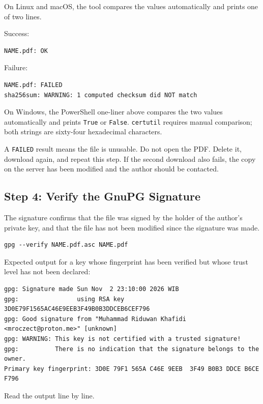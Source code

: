 On Linux and macOS, the tool compares the values automatically and
prints one of two lines.

Success:

\begin{lstlisting}[style=out]
NAME.pdf: OK
\end{lstlisting}

Failure:

\begin{lstlisting}[style=out]
NAME.pdf: FAILED
sha256sum: WARNING: 1 computed checksum did NOT match
\end{lstlisting}

On Windows, the PowerShell one-liner above compares the two values
automatically and prints \texttt{True} or \texttt{False}.
\texttt{certutil} requires manual comparison; both strings are
sixty-four hexadecimal characters.

A \texttt{FAILED} result means the file is unusable. Do not open
the PDF. Delete it, download again, and repeat this step. If the
second download also fails, the copy on the server has been
modified and the author should be contacted.

\subsection*{Step 4: Verify the GnuPG Signature}

The signature confirms that the file was signed by the holder of
the author's private key, and that the file has not been modified
since the signature was made.

\begin{lstlisting}[style=code]
gpg --verify NAME.pdf.asc NAME.pdf
\end{lstlisting}

Expected output for a key whose fingerprint has been verified but
whose trust level has not been declared:

\begin{lstlisting}[style=out]
gpg: Signature made Sun Nov  2 23:10:00 2026 WIB
gpg:                using RSA key 3D0E79F1565AC46E9EEB3F49B0B3DDCEB6CEF796
gpg: Good signature from "Muhammad Riduwan Khafidi <mroczect@proton.me>" [unknown]
gpg: WARNING: This key is not certified with a trusted signature!
gpg:          There is no indication that the signature belongs to the owner.
Primary key fingerprint: 3D0E 79F1 565A C46E 9EEB  3F49 B0B3 DDCE B6CE F796
\end{lstlisting}

Read the output line by line.

